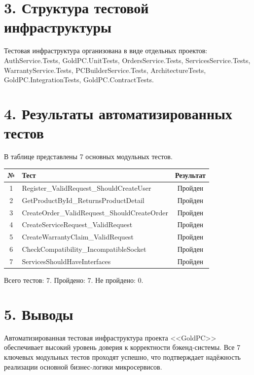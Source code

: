 \documentclass[12pt,a4paper]{article}
\begin{document}
\section{3. Структура тестовой инфраструктуры}

Тестовая инфраструктура организована в виде отдельных проектов: AuthService.Tests, GoldPC.UnitTests, OrdersService.Tests, ServicesService.Tests, WarrantyService.Tests, PCBuilderService.Tests, ArchitectureTests, GoldPC.IntegrationTests, GoldPC.ContractTests.

\section{4. Результаты автоматизированных тестов}

В таблице представлены 7 основных модульных тестов.

\begin{center}
\begin{tabularx}{\textwidth}{|c|X|c|}
\hline
№ & Тест & Результат \\
\hline
1 & Register\_ValidRequest\_ShouldCreateUser & Пройден \\
\hline
2 & GetProductById\_ReturnsProductDetail & Пройден \\
\hline
3 & CreateOrder\_ValidRequest\_ShouldCreateOrder & Пройден \\
\hline
4 & CreateServiceRequest\_ValidRequest & Пройден \\
\hline
5 & CreateWarrantyClaim\_ValidRequest & Пройден \\
\hline
6 & CheckCompatibility\_IncompatibleSocket & Пройден \\
\hline
7 & ServicesShouldHaveInterfaces & Пройден \\
\hline
\end{tabularx}
\end{center}

Всего тестов: 7. Пройдено: 7. Не пройдено: 0.

\section{5. Выводы}

Автоматизированная тестовая инфраструктура проекта <<GoldPC>> обеспечивает высокий уровень доверия к корректности бэкенд-системы. Все 7 ключевых модульных тестов проходят успешно, что подтверждает надёжность реализации основной бизнес-логики микросервисов.
\end{document}
